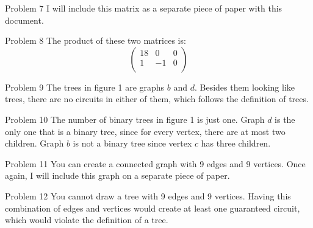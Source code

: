 \documentclass[12pt]{article}
\begin{document}
  \begin{problem}{Problem 7}
    I will include this matrix as a separate piece of paper with this document.
  \end{problem}

  \begin{problem}{Problem 8}
    The product of these two matrices is:
    \begin{equation*}
      \begin{pmatrix}
        18 & 0 & 0 \\
        1 & -1 & 0 \\
      \end{pmatrix}
    \end{equation*}
  \end{problem}

  \begin{problem}{Problem 9}
    The trees in figure 1 are graphs $b$ and $d$. Besides them looking like trees, there are no circuits in either
    of them, which follows the definition of trees.
  \end{problem}

  \begin{problem}{Problem 10}
    The number of binary trees in figure 1 is just one. Graph $d$ is the only one that is a binary tree, since 
    for every vertex, there are at most two children. Graph $b$ is not a binary tree since vertex $c$ has three
    children.
  \end{problem}

  \begin{problem}{Problem 11}
    You can create a connected graph with 9 edges and 9 vertices. Once again, I will include this graph on a separate
    piece of paper.
  \end{problem}

  \begin{problem}{Problem 12}
    You cannot draw a tree with 9 edges and 9 vertices. Having this combination of edges and vertices would create
    at least one guaranteed circuit, which would violate the definition of a tree.
  \end{problem}
\end{document}
